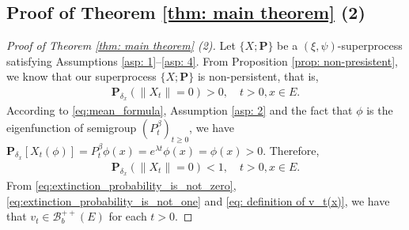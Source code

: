 \documentclass[12pt,a4paper]{amsart}
\theoremstyle{definition}
\numberwithin{equation}{section}
\begin{document}
\subsection{Proof of Theorem \ref{thm: main theorem} (2)}
\label{sec: proof of result 2}
\begin{proof}
  [Proof of Theorem \ref{thm: main theorem} (2)]
  Let $\{X; \mathbf P\}$ be a $(\xi, \psi)$-superprocess satisfying
  Assumptions \ref{asp: 1}--\ref{asp: 4}.
  From Proposition \ref{prop: non-presistent}, we know that our superprocess $\{X;\mathbf P\}$ is non-persistent, that is,
  \begin{align}
    \label{eq:extinction_probability_is_not_zero}
    \mathbf P_{\delta_x}(\|X_t\| = 0)
    > 0,
    \quad t>0, x \in E.
  \end{align}
  According to \eqref{eq:mean_formula}, Assumption \ref{asp: 2} and the fact that $\phi$ is the eigenfunction of semigroup $(P_t^\beta)_{t\geq 0}$, we have $\mathbf P_{\delta_x}[X_t(\phi)] = P_t^\beta \phi(x) = e^{\lambda t} \phi(x)= \phi(x)>0$.
  Therefore,
  \begin{align}
    \label{eq:extinction_probability_is_not_one}
    \mathbf P_{\delta_x}(\|X_t\|= 0)<1,
    \quad t>0, x \in E.
  \end{align}
  From \eqref{eq:extinction_probability_is_not_zero}, \eqref{eq:extinction_probability_is_not_one} and \eqref{eq: definition of v_t(x)}, we have that $v_t \in \mathscr B^{++}_b(E)$ for each $t > 0$.
  

\end{proof}
\end{document}
